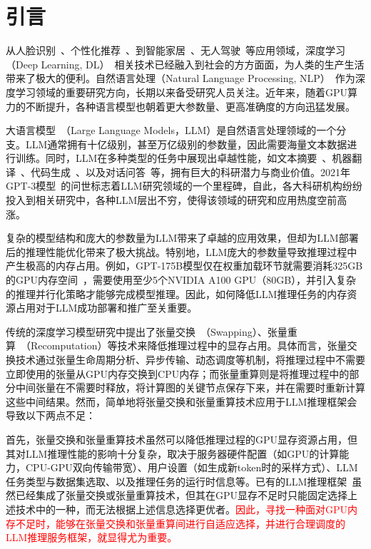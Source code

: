 \section{引言}

从人脸识别~\cite{Face-Recognition}、个性化推荐~\cite{Personal-Recommendation}、到智能家居~\cite{Smart-Home}、无人驾驶~\cite{Self-Driving}等应用领域，深度学习（Deep Learning, DL）~\cite{Deep-Learning}相关技术已经融入到社会的方方面面，为人类的生产生活带来了极大的便利。自然语言处理（Natural Language Processing, NLP）~\cite{NLP}作为深度学习领域的重要研究方向，长期以来备受研究人员关注。近年来，随着GPU算力的不断提升，各种语言模型也朝着更大参数量、更高准确度的方向迅猛发展。

大语言模型~\cite{LLM}（Large Language Models，LLM）是自然语言处理领域的一个分支。LLM通常拥有十亿级别，甚至万亿级别的参数量，因此需要海量文本数据进行训练。同时，LLM在多种类型的任务中展现出卓越性能，如文本摘要~\cite{Text-Summarization}、机器翻译~\cite{Machine-Translation}、代码生成~\cite{Code-Generation}、以及对话问答~\cite{Question-Answer}等，拥有巨大的科研潜力与商业价值。2021年GPT-3模型~\cite{Text-Summarization, GPT3}的问世标志着LLM研究领域的一个里程碑，自此，各大科研机构纷纷投入到相关研究中，各种LLM层出不穷，使得该领域的研究和应用热度空前高涨。

复杂的模型结构和庞大的参数量为LLM带来了卓越的应用效果，但却为LLM部署后的推理性能优化带来了极大挑战。特别地，LLM庞大的参数量导致推理过程中产生极高的内存占用。例如，GPT-175B模型仅在权重加载环节就需要消耗325GB的GPU内存空间~\cite{GPT-175B资源消耗}，需要使用至少5个NVIDIA A100 GPU（80GB），并引入复杂的推理并行化策略才能够完成模型推理。因此，如何降低LLM推理任务的内存资源占用对于LLM成功部署和推广至关重要。

传统的深度学习模型研究中提出了张量交换~\cite{Swapping}（Swapping）、张量重算~\cite{Recomputation}（Recomputation）等技术来降低推理过程中的显存占用。具体而言，张量交换技术通过张量生命周期分析、异步传输、动态调度等机制，将推理过程中不需要立即使用的张量从GPU内存交换到CPU内存；而张量重算则是将推理过程中的部分中间张量在不需要时释放，将计算图的关键节点保存下来，并在需要时重新计算这些中间结果。然而，简单地将张量交换和张量重算技术应用于LLM推理框架会导致以下两点不足：

首先，张量交换和张量重算技术虽然可以降低推理过程的GPU显存资源占用，但其对LLM推理性能的影响十分复杂，取决于服务器硬件配置（如GPU的计算能力，CPU-GPU双向传输带宽）、用户设置（如生成新token时的采样方式）、LLM任务类型与数据集选取、以及推理任务的运行时信息等。已有的LLM推理框架~\cite{Swapping, vLLM, ORCA}虽然已经集成了张量交换或张量重算技术，但其在GPU显存不足时只能固定选择上述技术中的一种，而无法根据上述信息选择更优者。\textcolor{red}{因此，寻找一种面对GPU内存不足时，能够在张量交换和张量重算间进行自适应选择，并进行合理调度的LLM推理服务框架，就显得尤为重要。}

